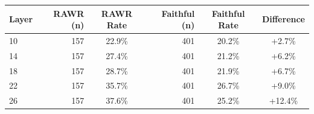 \begin{tabular}{lrcrcc}
\toprule
Layer & RAWR (n) & RAWR Rate & Faithful (n) & Faithful Rate & Difference \\
\midrule
10 & 157 & 22.9\% & 401 & 20.2\% & +2.7\% \\
14 & 157 & 27.4\% & 401 & 21.2\% & +6.2\% \\
18 & 157 & 28.7\% & 401 & 21.9\% & +6.7\% \\
22 & 157 & 35.7\% & 401 & 26.7\% & +9.0\% \\
26 & 157 & 37.6\% & 401 & 25.2\% & +12.4\% \\
\bottomrule
\end{tabular}
